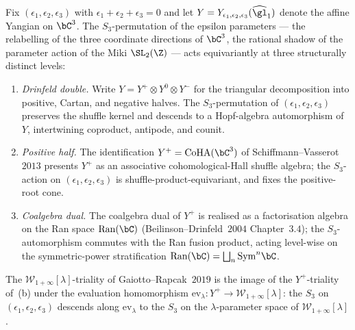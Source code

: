 \begin{theorem}
\label{thm:plat-Miki-S3}
Fix $(\epsilon_1,\epsilon_2,\epsilon_3)$ with $\epsilon_1+\epsilon_2+\epsilon_3=0$
and let $Y=Y_{\epsilon_1,\epsilon_2,\epsilon_3}(\widehat{\gl}_1)$ denote the
affine Yangian on $\bC^3$. The $S_3$-permutation of the epsilon
parameters --- the relabelling of the three coordinate directions of
$\bC^3$, the rational shadow of the parameter action of the Miki
$\SL_2(\Z)$ --- acts equivariantly at three structurally distinct
levels:
\begin{enumerate}[label=\textup{(\alph*)}]
\item \emph{Drinfeld double.} Write $Y=Y^+\otimes Y^0\otimes Y^-$ for
 the triangular decomposition into positive, Cartan, and negative
 halves. The $S_3$-permutation of $(\epsilon_1,\epsilon_2,\epsilon_3)$
 preserves the shuffle kernel and descends to a Hopf-algebra
 automorphism of $Y$, intertwining coproduct, antipode, and counit.
\item \emph{Positive half.} The identification
 $Y^+=\mathrm{CoHA}(\bC^3)$ of Schiffmann--Vasserot~$2013$
 presents $Y^+$ as an associative cohomological-Hall shuffle algebra;
 the $S_3$-action on $(\epsilon_1,\epsilon_2,\epsilon_3)$ is
 shuffle-product-equivariant, and fixes the positive-root cone.
\item \emph{Coalgebra dual.} The coalgebra dual of $Y^+$ is
 realised as a factorisation algebra on the Ran space $\mathrm{Ran}(\bC)$
 (Beilinson--Drinfeld~$2004$ Chapter~$3.4$); the $S_3$-automorphism
 commutes with the Ran fusion product, acting level-wise on the
 symmetric-power stratification $\mathrm{Ran}(\bC)=\bigsqcup_n \mathrm{Sym}^n\bC$.
\end{enumerate}
The $\mathcal W_{1+\infty}[\lambda]$-triality of Gaiotto--Rapcak~$2019$
is the image of the $Y^+$-triality of~(b) under the evaluation
homomorphism $\mathrm{ev}_\lambda\colon Y^+\to\mathcal W_{1+\infty}[\lambda]$:
the $S_3$ on $(\epsilon_1,\epsilon_2,\epsilon_3)$ descends along
$\mathrm{ev}_\lambda$ to the $S_3$ on the $\lambda$-parameter space
of $\mathcal W_{1+\infty}[\lambda]$.
\end{theorem}

